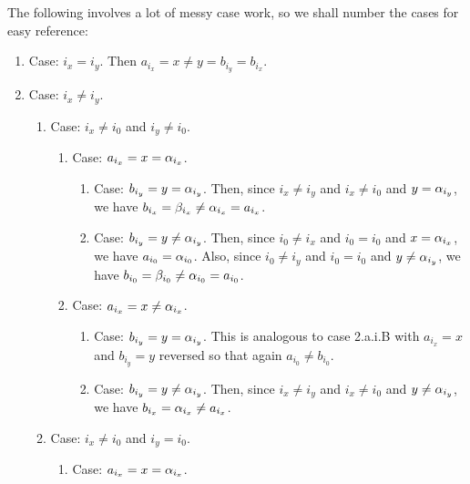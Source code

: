 {{    The following involves a lot of messy case work, so we shall number the cases for easy reference:
    \begin{enumerate}
      \item Case: $i_x = i_y$.
            Then $a_{i_x} = x \neq y = b_{i_y} = b_{i_x}$.
      \item Case: $i_x \neq i_y$.
            \begin{enumerate}
              \item Case: $i_x \neq i_0$ and $i_y \neq i_0$.
                    \begin{enumerate}
                      \item Case: $a_{i_x} = x = \alpha_{i_x}$.
                            \begin{enumerate}
                              \item Case: $b_{i_y} = y = \alpha_{i_y}$.
                                    Then, since $i_x \neq i_y$ and $i_x \neq i_0$ and $y = \alpha_{i_y}$, we have $b_{i_x} = \beta_{i_x} \neq \alpha_{i_x} = a_{i_x}$.
                              \item Case: $b_{i_y} = y \neq \alpha_{i_y}$.
                                    Then, since $i_0 \neq i_x$ and $i_0 = i_0$ and $x = \alpha_{i_x}$, we have $a_{i_0} = \alpha_{i_0}$.
                                    Also, since $i_0 \neq i_y$ and $i_0 = i_0$ and $y \neq \alpha_{i_y}$, we have $b_{i_0} = \beta_{i_0} \neq \alpha_{i_0} = a_{i_0}$.
                            \end{enumerate}
                      \item Case: $a_{i_x} = x \neq \alpha_{i_x}$.
                            \begin{enumerate}
                              \item Case: $b_{i_y} = y = \alpha_{i_y}$.
                                    This is analogous to case 2.a.i.B with $a_{i_x} = x$ and $b_{i_y} = y$ reversed so that again $a_{i_0} \neq b_{i_0}$.
                              \item Case: $b_{i_y} = y \neq \alpha_{i_y}$.
                                    Then, since $i_x \neq i_y$ and $i_x \neq i_0$ and $y \neq \alpha_{i_y}$, we have $b_{i_x} = \alpha_{i_x} \neq a_{i_x}$.
                            \end{enumerate}
                    \end{enumerate}
              \item Case: $i_x \neq i_0$ and $i_y = i_0$.
                    \begin{enumerate}
                      \item Case: $a_{i_x} = x = \alpha_{i_x}$.

\end{enumerate}
\end{enumerate}
\end{enumerate}}}
